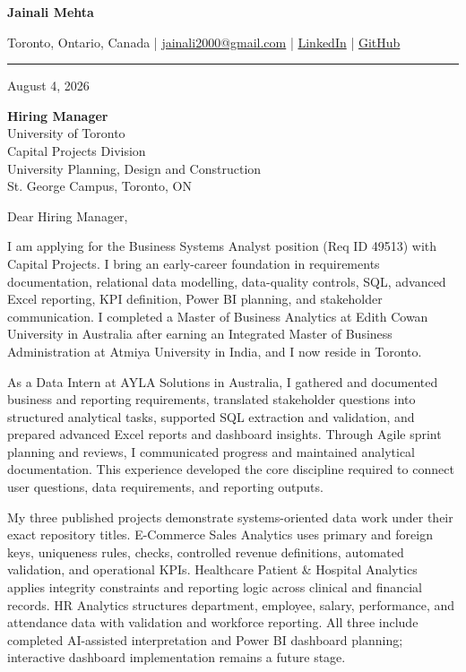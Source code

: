 \documentclass[letterpaper,10pt]{article}
\begin{document}
\begin{center}
  {\fontsize{17}{19}\selectfont\textbf{Jainali Mehta}}\par\vspace{2pt}
  \small Toronto, Ontario, Canada \;|\;
  \href{mailto:jainali2000@gmail.com}{jainali2000@gmail.com} \;|\;
  \href{https://www.linkedin.com/in/jainali-mehta}{LinkedIn} \;|\;
  \href{https://github.com/jainalimehta}{GitHub}
\end{center}
\vspace{-5pt}
\noindent\rule{\textwidth}{0.4pt}

August 4, 2026

\textbf{Hiring Manager}\\
University of Toronto\\
Capital Projects Division\\
University Planning, Design and Construction\\
St. George Campus, Toronto, ON

Dear Hiring Manager,

I am applying for the Business Systems Analyst position (Req ID 49513) with Capital Projects. I bring an early-career foundation in requirements documentation, relational data modelling, data-quality controls, SQL, advanced Excel reporting, KPI definition, Power BI planning, and stakeholder communication. I completed a Master of Business Analytics at Edith Cowan University in Australia after earning an Integrated Master of Business Administration at Atmiya University in India, and I now reside in Toronto.

As a Data Intern at AYLA Solutions in Australia, I gathered and documented business and reporting requirements, translated stakeholder questions into structured analytical tasks, supported SQL extraction and validation, and prepared advanced Excel reports and dashboard insights. Through Agile sprint planning and reviews, I communicated progress and maintained analytical documentation. This experience developed the core discipline required to connect user questions, data requirements, and reporting outputs.

My three published projects demonstrate systems-oriented data work under their exact repository titles. E-Commerce Sales Analytics uses primary and foreign keys, uniqueness rules, checks, controlled revenue definitions, automated validation, and operational KPIs. Healthcare Patient \& Hospital Analytics applies integrity constraints and reporting logic across clinical and financial records. HR Analytics structures department, employee, salary, performance, and attendance data with validation and workforce reporting. All three include completed AI-assisted interpretation and Power BI dashboard planning; interactive dashboard implementation remains a future stage.
\end{document}
